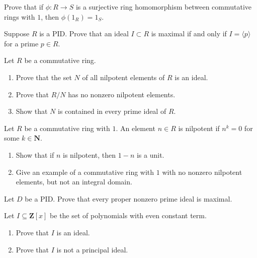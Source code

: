 \documentclass[11pt,twoside,openany]{memoir}
\begin{document}
    \begin{exercise}
    Prove that if $\phi:R\to S$ is a surjective ring homomorphism between commutative rings with $1$, then $\phi(1_R)=1_S$.
    \end{exercise}
    
    \begin{exercise}
    Suppose $R$ is a PID. Prove that an ideal $I\subset R$ is maximal if and only if $I=\langle p\rangle$ for a prime $p\in R$.
    \end{exercise}
    
    \begin{exercise}
    Let $R$ be a commutative ring.
    \begin{enumerate}[label=(\alph*)]
        \item Prove that the set $N$ of all nilpotent elements of $R$ is an ideal.
        \item Prove that $R/N$ has no nonzero nilpotent elements.
        \item Show that $N$ is contained in every prime ideal of $R$.
    \end{enumerate}
    \end{exercise}
    
    \begin{exercise}
    Let $R$ be a commutative ring with $1$. An element $n\in R$ is nilpotent if $n^k=0$ for some $k\in \mathbf{N}$.
    \begin{enumerate}[label=(\alph*)]
        \item Show that if $n$ is nilpotent, then $1-n$ is a unit.
        \item Give an example of a commutative ring with $1$ with no nonzero nilpotent elements, but not an integral domain.
    \end{enumerate}
    \end{exercise}
    
    \begin{exercise}
    Let $D$ be a PID. Prove that every proper nonzero prime ideal is maximal.
    \end{exercise}
    
    \begin{exercise}
    Let $I\subseteq \mathbf{Z}[x]$ be the set of polynomials with even constant term.
    \begin{enumerate}[label=(\alph*)]
        \item Prove that $I$ is an ideal.
        \item Prove that $I$ is not a principal ideal.
    \end{enumerate}
    \end{exercise}
    
\end{document}
